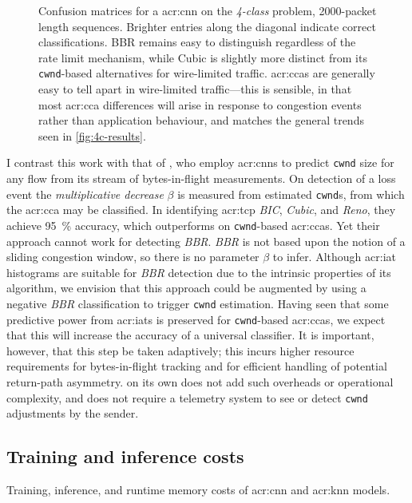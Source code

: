 \begin{figure}
    \caption[Confusion matrices for a CNN on the \emph{4-class} problem, \num{2000}-packet length sequences.]{Confusion matrices for a \gls{acr:cnn} on the \emph{4-class} problem, \num{2000}-packet length sequences. Brighter entries along the diagonal indicate correct classifications. BBR remains easy to distinguish regardless of the rate limit mechanism, while Cubic is slightly more distinct from its \texttt{cwnd}-based alternatives for wire-limited traffic. \glspl{acr:cca} are generally easy to tell apart in wire-limited traffic---this is sensible, in that most \gls{acr:cca} differences will arise in response to congestion events rather than application behaviour, and matches the general trends seen in \cref{fig:4c-results}.}
    \label{fig:4c-cnn-conf}
\end{figure}

I contrast this work with that of \textcite{DBLP:conf/icccn/HagosEYK18}, who employ \glspl{acr:cnn} to predict \texttt{cwnd} size for any flow from its stream of bytes-in-flight measurements.
On detection of a loss event the \emph{multiplicative decrease} $\beta$ is measured from estimated \texttt{cwnd}s, from which the \gls{acr:cca} may be classified.
In identifying \gls{acr:tcp} \emph{BIC}, \emph{Cubic}, and \emph{Reno}, they achieve \qty{95}{\percent} accuracy, which outperforms \seidr{} on \texttt{cwnd}-based \glspl{acr:cca}.
Yet their approach cannot work for detecting \emph{BBR}. 
\emph{BBR} is not based upon the notion of a sliding congestion window, so there is no parameter $\beta$ to infer.
Although \gls{acr:iat} histograms are suitable for \emph{BBR} detection due to the intrinsic properties of its algorithm, we envision that this approach could be augmented by using a negative \emph{BBR} classification to trigger \texttt{cwnd} estimation.
Having seen that some predictive power from \glspl{acr:iat} is preserved for \texttt{cwnd}-based \glspl{acr:cca}, we expect that this will increase the accuracy of a universal classifier.
It is important, however, that this step be taken adaptively; this incurs higher resource requirements for bytes-in-flight tracking and for efficient handling of potential return-path asymmetry.
\seidr{} on its own does not add such overheads or operational complexity, and does not require a telemetry system to see or detect \texttt{cwnd} adjustments by the sender.

\subsection{Training and inference costs}
\begin{table}[]
    \centering
    \caption[Training, inference, and runtime memory costs of CNN and $k$NN models.]{Training, inference, and runtime memory costs of \gls{acr:cnn} and \gls{acr:knn} models.}
    \label{tab:train-test-times}
\end{table}

